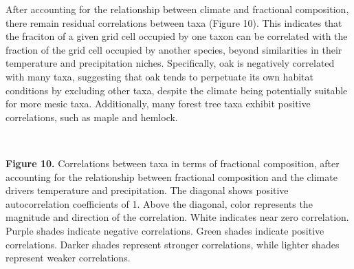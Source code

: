 \documentclass[11pt]{article}
\begin{document}
After accounting for the relationship between climate and fractional
composition, there remain residual correlations between taxa (Figure
10). This indicates that the fraciton of a given grid cell occupied by
one taxon can be correlated with the fraction of the grid cell occupied
by another species, beyond similarities in their temperature and
precipitation niches. Specifically, oak is negatively correlated with
many taxa, suggesting that oak tends to perpetuate its own habitat
conditions by excluding other taxa, despite the climate being
potentially suitable for more mesic taxa. Additionally, many forest tree
taxa exhibit positive correlations, such as maple and hemlock.
 
            
    
    \begin{center}
    \end{center}
    { \hspace*{\fill} \\}
    

    \textbf{Figure 10.} Correlations between taxa in terms of fractional
composition, after accounting for the relationship between fractional
composition and the climate drivers temperature and precipitation. The
diagonal shows positive autocorrelation coefficients of 1. Above the
diagonal, color represents the magnitude and direction of the
correlation. White indicates near zero correlation. Purple shades
indicate negative correlations. Green shades indicate positive
correlations. Darker shades represent stronger correlations, while
lighter shades represent weaker correlations.


    
    
    
\end{document}
